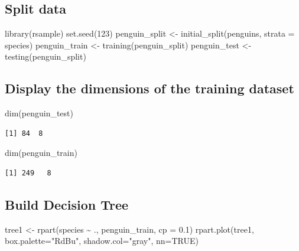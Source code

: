 \documentclass[
  letterpaper,
  DIV=11,
  numbers=noendperiod]{scrreprt}
\newenvironment{Shaded}{\begin{snugshade}}{\end{snugshade}}
\newcommand{\AttributeTok}[1]{\textcolor[rgb]{0.40,0.45,0.13}{#1}}
\newcommand{\ConstantTok}[1]{\textcolor[rgb]{0.56,0.35,0.01}{#1}}
\newcommand{\DecValTok}[1]{\textcolor[rgb]{0.68,0.00,0.00}{#1}}
\newcommand{\FloatTok}[1]{\textcolor[rgb]{0.68,0.00,0.00}{#1}}
\newcommand{\FunctionTok}[1]{\textcolor[rgb]{0.28,0.35,0.67}{#1}}
\newcommand{\NormalTok}[1]{\textcolor[rgb]{0.00,0.23,0.31}{#1}}
\newcommand{\OtherTok}[1]{\textcolor[rgb]{0.00,0.23,0.31}{#1}}
\newcommand{\SpecialCharTok}[1]{\textcolor[rgb]{0.37,0.37,0.37}{#1}}
\newcommand{\StringTok}[1]{\textcolor[rgb]{0.13,0.47,0.30}{#1}}
\begin{document}
\subsection{Split data}\label{split-data}

\begin{Shaded}
\begin{Highlighting}[]
\FunctionTok{library}\NormalTok{(rsample)}
\FunctionTok{set.seed}\NormalTok{(}\DecValTok{123}\NormalTok{)}
\NormalTok{penguin\_split }\OtherTok{\textless{}{-}} \FunctionTok{initial\_split}\NormalTok{(penguins, }\AttributeTok{strata =}\NormalTok{ species)}
\NormalTok{penguin\_train }\OtherTok{\textless{}{-}} \FunctionTok{training}\NormalTok{(penguin\_split)}
\NormalTok{penguin\_test }\OtherTok{\textless{}{-}} \FunctionTok{testing}\NormalTok{(penguin\_split)}
\end{Highlighting}
\end{Shaded}

\subsection{Display the dimensions of the training
dataset}\label{display-the-dimensions-of-the-training-dataset}

\begin{Shaded}
\begin{Highlighting}[]
\FunctionTok{dim}\NormalTok{(penguin\_test)}
\end{Highlighting}
\end{Shaded}

\begin{verbatim}
[1] 84  8
\end{verbatim}

\begin{Shaded}
\begin{Highlighting}[]
\FunctionTok{dim}\NormalTok{(penguin\_train)}
\end{Highlighting}
\end{Shaded}

\begin{verbatim}
[1] 249   8
\end{verbatim}

\subsection{Build Decision Tree}\label{build-decision-tree}

\begin{Shaded}
\begin{Highlighting}[]
\NormalTok{tree1 }\OtherTok{\textless{}{-}} \FunctionTok{rpart}\NormalTok{(species }\SpecialCharTok{\textasciitilde{}}\NormalTok{ ., penguin\_train,  }\AttributeTok{cp =} \FloatTok{0.1}\NormalTok{)}
\FunctionTok{rpart.plot}\NormalTok{(tree1, }\AttributeTok{box.palette=}\StringTok{"RdBu"}\NormalTok{, }\AttributeTok{shadow.col=}\StringTok{"gray"}\NormalTok{, }\AttributeTok{nn=}\ConstantTok{TRUE}\NormalTok{)}
\end{Highlighting}
\end{Shaded}
\end{document}
